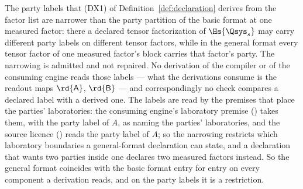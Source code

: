 
\begin{remark}\label{rem:party-label-restriction}
The party labels that (DX1) of Definition~\ref{def:declaration} derives from
the factor list are narrower than the party partition of the basic format at
one measured factor: there a declared tensor factorization of $\Hs{\Qsys_s}$
may carry different party labels on different tensor factors, while in the
general format every tensor factor of one measured factor's block carries
that factor's party. The narrowing is admitted and not repaired. No
derivation of the compiler or of the consuming engine reads those labels ---
what the derivations consume is the readout maps $\rd{\mathsf A}$,
$\rd{\mathsf B}$ --- and correspondingly no check compares a declared label
with a derived one. The labels are read by the premises that place the
parties' laboratories: the consuming engine's laboratory premise
() takes them, with the party label of $A$, as naming
the parties' laboratories, and the source licence
() reads the party label of $A$; so the narrowing restricts which laboratory boundaries a
general-format declaration can state, and a declaration that wants two parties inside one
 declares two measured factors instead. So the general format
coincides with the basic format entry for entry on every component a
derivation reads, and on the party labels it is a restriction.
\end{remark}
